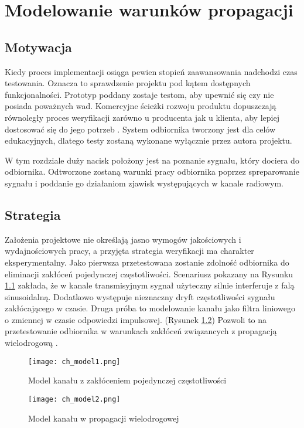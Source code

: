 \chapter{Modelowanie warunków propagacji}
\section{Motywacja}
Kiedy proces implementacji osiąga pewien stopień zaawansowania nadchodzi czas testowania. 
Oznacza to sprawdzenie projektu pod kątem dostępnych funkcjonalności. 
Prototyp poddany zostaje testom, aby upewnić się czy nie posiada poważnych wad. 
Komercyjne ścieżki rozwoju produktu dopuszczają równoległy proces weryfikacji zarówno u producenta jak u klienta, aby lepiej dostosować się do jego potrzeb \cite{product_dev}. 
System odbiornika tworzony jest dla celów edukacyjnych, dlatego testy zostaną wykonane wyłącznie przez autora projektu. 

W tym rozdziale duży nacisk położony jest na poznanie sygnału, który dociera do odbiornika. 
Odtworzone zostaną warunki pracy odbiornika poprzez spreparowanie sygnału i poddanie go działaniom zjawisk występujących w kanale radiowym. 
\section{Strategia}
Założenia projektowe nie określają jasno wymogów jakościowych i wydajnościowych pracy, a przyjęta strategia weryfikacji ma charakter eksperymentalny. 
Jako pierwsza przetestowana zostanie zdolność odbiornika do eliminacji zakłóceń pojedynczej częstotliwości. 
Scenariusz pokazany na Rysunku \ref{cwmodel} zakłada, że w kanale transmisyjnym sygnał użyteczny silnie interferuje z falą sinusoidalną. 
Dodatkowo występuje nieznaczny dryft częstotliwości sygnału zakłócającego w czasie.
Druga próba to modelowanie kanału jako filtra liniowego o zmiennej w czasie odpowiedzi impulsowej. (Rysunek \ref{mpathmodel})
Pozwoli to na przetestowanie odbiornika w warunkach zakłóceń związancych z propagacją wielodrogową \cite{indoor_ch_model}.

\begin{figure}[ht]
\centering
\texttt{[image: ch\_model1.png]}
\caption{Model kanału z zakłóceniem pojedynczej częstotliwości}
\label{cwmodel}
\end{figure}

\begin{figure}[ht]
\centering
\texttt{[image: ch\_model2.png]}
\caption{Model kanału w propagacji wielodrogowej}
\label{mpathmodel}
\end{figure}

